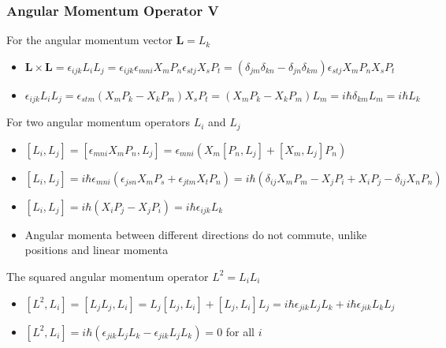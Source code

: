 \documentclass[8pt,t,mathserif,aspectratio=169]{beamer}
\begin{document}
\begin{frame}
  \frametitle{Angular Momentum Operator V}
  \vspace{1mm}
  For the angular momentum vector $\textbf{L} = L_k$
  \begin{itemize}
    \item $\textbf{L} \times \textbf{L} = \epsilon_{ijk} L_i L_j = \epsilon_{ijk} \epsilon_{mni} X_m P_n \epsilon_{stj} X_s P_t = (\delta_{jm} \delta_{kn} - \delta_{jn} \delta_{km}) \epsilon_{stj} X_m P_n X_s P_t$
    \item $\epsilon_{ijk} L_i L_j = \epsilon_{stm} (X_m P_k - X_k P_m) X_s P_t = (X_m P_k - X_k P_m) L_m = i \hbar \delta_{km} L_m = i \hbar L_k$
  \end{itemize}
  For two angular momentum operators $L_i$ and $L_j$
  \begin{itemize}
    \item $[L_i,L_j] = [\epsilon_{mni} X_m P_n,L_j] = \epsilon_{mni} (X_m [P_n,L_j] + [X_m,L_j] P_n)$
    \item $[L_i,L_j] = i \hbar \epsilon_{mni} (\epsilon_{jsn} X_m P_s + \epsilon_{jtm} X_t P_n) = i \hbar (\delta_{ij} X_m P_m - X_j P_i + X_i P_j - \delta_{ij} X_n P_n)$
    \item $[L_i,L_j] = i \hbar (X_i P_j - X_j P_i) = i \hbar \epsilon_{ijk} L_k$
    \item Angular momenta between different directions do not commute, unlike positions and linear momenta
  \end{itemize}
  The squared angular momentum operator $L^2 = L_i L_i$
  \begin{itemize}
    \item $[L^2,L_i] = [L_j L_j,L_i] = L_j [L_j,L_i] + [L_j,L_i] L_j = i \hbar \epsilon_{jik} L_j L_k + i \hbar \epsilon_{jik} L_k L_j$
    \item $[L^2,L_i] = i \hbar (\epsilon_{jik} L_j L_k - \epsilon_{jik} L_j L_k) = 0$ for all $i$
  \end{itemize}
\end{frame}
\end{document}
